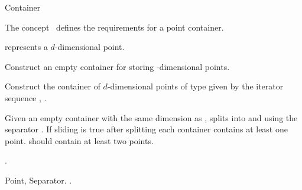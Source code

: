 

\begin{ccRefConcept}{Container}


\ccDefinition
  
The concept \ccRefName\ defines the requirements for
a point container. 

\ccParameters

 represents a $d$-dimensional point.


\ccCreation
{}  %

{
Construct an empty container for storing -dimensional points.
}

{
Construct the container of $d$-dimensional points of type 
given by the iterator sequence , .
}

\ccOperations

{Given an empty container  with the same dimension as , splits  into
 and  using the separator . If sliding is true after splitting 
each container contains at least one point.  should contain at least two points.}

\ccHasModels

.

\ccSeeAlso

Point, Separator.
.

\end{ccRefConcept}


